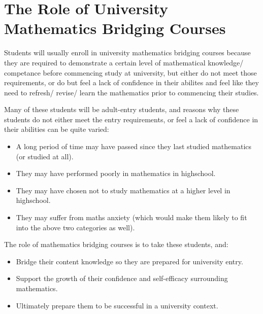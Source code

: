 \documentclass[twoside,12pt,a4paper]{report}
\begin{document}
\section{The Role of University Mathematics Bridging Courses}

Students will usually enroll in university mathematics bridging courses because they are required to demonstrate a certain level of mathematical knowledge/ competance before commencing study at university, but either do not meet those requirements, or do but feel a lack of confidence in their abilites and feel like they need to refresh/ revise/ learn the mathematics prior to commencing their studies.

Many of these students will be adult-entry students, and reasons why these students do not either meet the entry requirements, or feel a lack of confidence in their abilities can be quite varied:
\begin{itemize}
	\item A long period of time may have passed since they last studied mathematics (or studied at all).
	\item They may have performed poorly in mathematics in highschool.
	\item They may have chosen not to study mathematics at a higher level in highschool.
	\item They may suffer from maths anxiety (which would make them likely to fit into the above two categories as well).
\end{itemize}
	
The role of mathematics bridging courses is to take these students, and:
\begin{itemize}
	\item Bridge their content knowledge so they are prepared for university entry.
	\item Support the growth of their confidence and self-efficacy surrounding mathematics.
	\item Ultimately prepare them to be successful in a university context.
\end{itemize}
\end{document}
